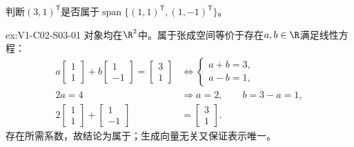\begin{SLChapterExercisePairSection}
\begin{exercise}[张成判断]\label{ex:V1-C02-S03-01}
判断$(3,1)^{\mathsf T}$是否属于$\operatorname{span}\{(1,1)^{\mathsf T},(1,-1)^{\mathsf T}\}$。
\end{exercise}
\label{sol:V1-C02-S03-01}
\begin{chapterexercisesolution}{ex:V1-C02-S03-01}
对象均在$\R^2$中。属于张成空间等价于存在$a,b\in\R$满足线性方程：
\[
\begin{aligned}
a\begin{bmatrix}1\\1\end{bmatrix}
+b\begin{bmatrix}1\\-1\end{bmatrix}
=\begin{bmatrix}3\\1\end{bmatrix}
&\Longleftrightarrow
\begin{cases}a+b=3,\\a-b=1,\end{cases}\\
2a=4&\Longrightarrow a=2,
\qquad b=3-a=1,\\
2\begin{bmatrix}1\\1\end{bmatrix}
+\begin{bmatrix}1\\-1\end{bmatrix}
&=\begin{bmatrix}3\\1\end{bmatrix}.
\end{aligned}
\]
存在所需系数，故结论为属于；生成向量无关又保证表示唯一。
\end{chapterexercisesolution}


\end{SLChapterExercisePairSection}
